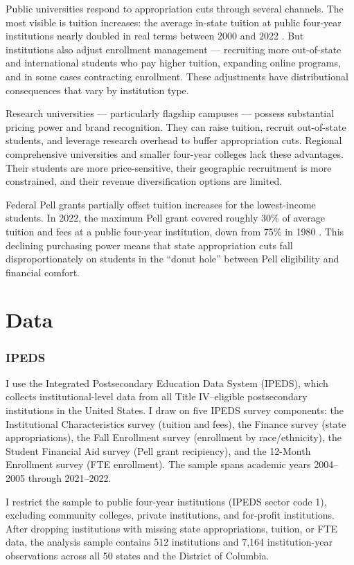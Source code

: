 \documentclass[12pt]{article}
\begin{document}
Public universities respond to appropriation cuts through several channels. The most visible is tuition increases: the average in-state tuition at public four-year institutions nearly doubled in real terms between 2000 and 2022 \citep{collegeboard2023trends}. But institutions also adjust enrollment management --- recruiting more out-of-state and international students who pay higher tuition, expanding online programs, and in some cases contracting enrollment. These adjustments have distributional consequences that vary by institution type.

Research universities --- particularly flagship campuses --- possess substantial pricing power and brand recognition. They can raise tuition, recruit out-of-state students, and leverage research overhead to buffer appropriation cuts. Regional comprehensive universities and smaller four-year colleges lack these advantages. Their students are more price-sensitive, their geographic recruitment is more constrained, and their revenue diversification options are limited.

Federal Pell grants partially offset tuition increases for the lowest-income students. In 2022, the maximum Pell grant covered roughly 30\% of average tuition and fees at a public four-year institution, down from 75\% in 1980 \citep{collegeboard2023trends}. This declining purchasing power means that state appropriation cuts fall disproportionately on students in the ``donut hole'' between Pell eligibility and financial comfort.

\section{Data}
\label{sec:data}

\subsubsection*{IPEDS} I use the Integrated Postsecondary Education Data System (IPEDS), which collects institutional-level data from all Title IV--eligible postsecondary institutions in the United States. I draw on five IPEDS survey components: the Institutional Characteristics survey (tuition and fees), the Finance survey (state appropriations), the Fall Enrollment survey (enrollment by race/ethnicity), the Student Financial Aid survey (Pell grant recipiency), and the 12-Month Enrollment survey (FTE enrollment). The sample spans academic years 2004--2005 through 2021--2022.

I restrict the sample to public four-year institutions (IPEDS sector code 1), excluding community colleges, private institutions, and for-profit institutions. After dropping institutions with missing state appropriations, tuition, or FTE data, the analysis sample contains 512 institutions and 7,164 institution-year observations across all 50 states and the District of Columbia.
\end{document}
